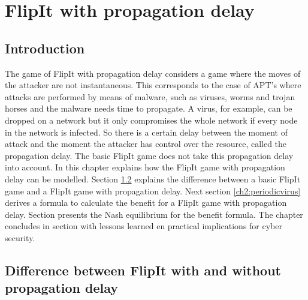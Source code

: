\chapter{FlipIt with propagation delay}
\label{chapter2:FlipIt with virus propagation}
%


\section{Introduction}
\label{Ch2:Intro}
The game of FlipIt with propagation delay considers a game where the moves of the attacker are not instantaneous. This corresponds to the case of APT's where attacks are performed by means of malware, such as viruses, worms and trojan horses and the malware needs time to propagate. A virus, for example, can be dropped on a network but it only compromises the whole network if every node in the network is infected. So there is a certain delay between the moment of attack and the moment the attacker has control over the resource, called the propagation delay. The basic FlipIt game does not take this propagation delay into account. In this chapter explains how the FlipIt game with propagation delay can be modelled. Section \ref{ch2:diffFlip} explains the difference between a basic FlipIt game and a FlipIt game with propagation delay. Next section \ref{ch2:periodicvirus} derives a formula to calculate the benefit for a FlipIt game with propagation delay. Section  presents the Nash equilibrium for the benefit formula. The chapter concludes in section  with lessons learned en practical implications for cyber security.
%
%
%

\section{Difference between FlipIt with and without propagation delay}
\label{ch2:diffFlip}

